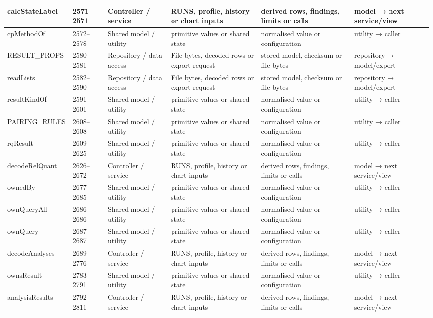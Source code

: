 \begin{landscape}
\begin{longtable}{@{}p{3.2cm}p{1.45cm}p{2.7cm}p{4.0cm}p{4.0cm}p{3.0cm}@{}}
calcStateLabel & 2571--2571 & Controller / service & RUNS, profile, history or chart inputs & derived rows, findings, limits or calls & model → next service/view \\\hline
cpMethodOf & 2572--2578 & Shared model / utility & primitive values or shared state & normalised value or configuration & utility → caller \\\hline
RESULT\_PROPS & 2580--2581 & Repository / data access & File bytes, decoded rows or export request & stored model, checksum or file bytes & repository → model/export \\\hline
readLists & 2582--2590 & Repository / data access & File bytes, decoded rows or export request & stored model, checksum or file bytes & repository → model/export \\\hline
resultKindOf & 2591--2601 & Shared model / utility & primitive values or shared state & normalised value or configuration & utility → caller \\\hline
PAIRING\_RULES & 2608--2608 & Shared model / utility & primitive values or shared state & normalised value or configuration & utility → caller \\\hline
rqResult & 2609--2625 & Shared model / utility & primitive values or shared state & normalised value or configuration & utility → caller \\\hline
decodeRelQuant & 2626--2672 & Controller / service & RUNS, profile, history or chart inputs & derived rows, findings, limits or calls & model → next service/view \\\hline
ownedBy & 2677--2685 & Shared model / utility & primitive values or shared state & normalised value or configuration & utility → caller \\\hline
ownQueryAll & 2686--2686 & Shared model / utility & primitive values or shared state & normalised value or configuration & utility → caller \\\hline
ownQuery & 2687--2687 & Shared model / utility & primitive values or shared state & normalised value or configuration & utility → caller \\\hline
decodeAnalyses & 2689--2776 & Controller / service & RUNS, profile, history or chart inputs & derived rows, findings, limits or calls & model → next service/view \\\hline
ownsResult & 2783--2791 & Shared model / utility & primitive values or shared state & normalised value or configuration & utility → caller \\\hline
analysisResults & 2792--2811 & Controller / service & RUNS, profile, history or chart inputs & derived rows, findings, limits or calls & model → next service/view \\\hline

\end{longtable}
\end{landscape}

